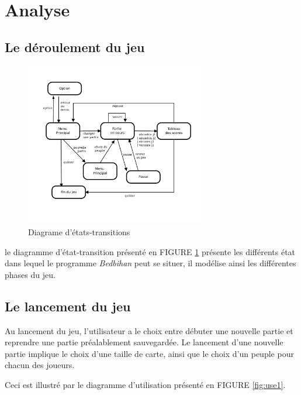 
\section{Analyse}

	
	\subsection{Le déroulement du jeu}


		\begin{figure}[h]
			\begin{center}
				\includegraphics[width=0.7\textwidth]{figure/etat_transition_partie.pdf}
			\end{center}
			\caption{Diagrame d'états-transitions}
			\label{fig:transition_jeu}
		\end{figure}
	
		le diagramme d'état-transition présenté en FIGURE \ref{fig:transition_jeu} présente les différents état dans lequel le programme \emph{Bedbihan} peut se situer, il modélise ainsi les différentes phases du jeu.


		\subsection{Le lancement du jeu}

		Au lancement du jeu, l'utilisateur a le choix entre débuter une nouvelle partie et reprendre une partie préalablement sauvegardée. Le lancement d'une nouvelle partie implique le choix d'une taille de carte, ainsi que le choix d'un peuple pour chacun des joueurs. 

		Ceci est illustré par le diagramme d'utilisation présenté en FIGURE \ref{fig:use1}.

